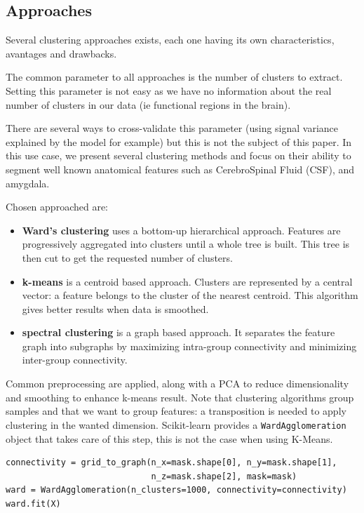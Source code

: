 \documentclass{frontiersSCNS} %
\begin{document}
\subsection{Approaches}

Several clustering approaches exists, each one having its own characteristics,
avantages and drawbacks.

The common parameter to all approaches is the number of clusters to extract.
Setting this parameter is not easy as we have no information about the real
number of clusters in our data (ie functional regions in the brain).

There are several ways to cross-validate this parameter (using signal variance
explained by the model for example) but this is not the subject of this paper.
In this use case, we present several clustering methods and focus on their
ability to segment well known anatomical features such as CerebroSpinal Fluid
(CSF), and amygdala.

Chosen approached are:
\begin{itemize}
    \item{\bf Ward's clustering} uses a bottom-up hierarchical approach. Features are
        progressively aggregated into clusters until a whole tree is built. This
        tree is then cut to get the requested number of clusters.
    \item{\bf k-means} is a centroid based approach. Clusters are represented by
        a central vector: a feature belongs to the cluster of the nearest
        centroid. This algorithm gives better results when data is smoothed.
    \item{\bf spectral clustering} is a graph based approach. It separates
        the feature graph into subgraphs by maximizing intra-group connectivity and
        minimizing inter-group connectivity.
\end{itemize}

Common preprocessing are applied, along with a PCA to reduce dimensionality and
smoothing to enhance k-means result. Note that clustering algorithms group
samples and that we want to group features: a transposition is needed to apply
clustering in the wanted dimension. Scikit-learn provides a
\texttt{WardAgglomeration} object that takes care of this step, this is not the
case when using K-Means.

\begin{lstlisting}
connectivity = grid_to_graph(n_x=mask.shape[0], n_y=mask.shape[1],
                             n_z=mask.shape[2], mask=mask)
ward = WardAgglomeration(n_clusters=1000, connectivity=connectivity)
ward.fit(X)
\end{lstlisting}
\end{document}
